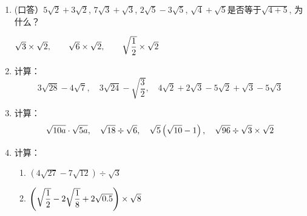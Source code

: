\begin{ex}
\begin{enumerate}
    \item (口答）$5\sqrt{2}+3\sqrt{2}$, $7\sqrt{3}+\sqrt{3}$, $2\sqrt{5}-3\sqrt{5}$, $\sqrt{4}+\sqrt{5}$是否等于$\sqrt{4+5}$, 为什么？

    $\sqrt{3}\times \sqrt{2},\qquad \sqrt{6}\times \sqrt{2},\qquad \sqrt{\dfrac{1}{2}}\times \sqrt{2}$

    \item 计算：
    \[3\sqrt{28}-4\sqrt{7},\quad 3\sqrt{24}-\sqrt{\frac{3}{2}},\quad 4\sqrt{2}+2\sqrt{3}-5\sqrt{2}+\sqrt{3}-5\sqrt{3}\]

    \item 计算：
    \[\sqrt{10a}\cdot \sqrt{5a},\quad \sqrt{18}\div \sqrt{6},\quad \sqrt{5}\left(\sqrt{10}-1\right),\quad \sqrt{96}\div \sqrt{3}\times \sqrt{2}\]
    \item 计算：
    \begin{enumerate}
        \item $\left(4\sqrt{27}-7\sqrt{12}\right)\div \sqrt{3}$
        \item $\left(\sqrt{\dfrac{1}{2}}-2\sqrt{\dfrac{1}{8}}+2\sqrt{0.5}\right)\times \sqrt{8}$
    \end{enumerate}
\end{enumerate}
\end{ex}

